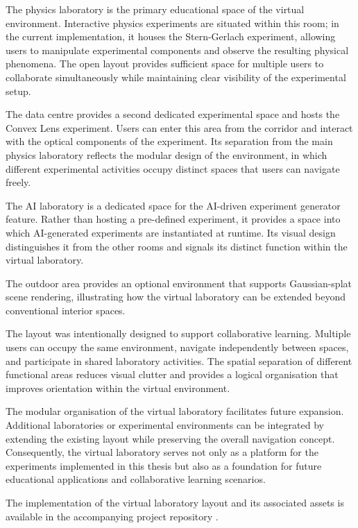 The physics laboratory is the primary educational space of the virtual environment. Interactive physics experiments are situated within this room; in the current implementation, it houses the Stern-Gerlach experiment, allowing users to manipulate experimental components and observe the resulting physical phenomena. The open layout provides sufficient space for multiple users to collaborate simultaneously while maintaining clear visibility of the experimental setup.

The data centre provides a second dedicated experimental space and hosts the Convex Lens experiment. Users can enter this area from the corridor and interact with the optical components of the experiment. Its separation from the main physics laboratory reflects the modular design of the environment, in which different experimental activities occupy distinct spaces that users can navigate freely.

The AI laboratory is a dedicated space for the AI-driven experiment generator feature. Rather than hosting a pre-defined experiment, it provides a space into which AI-generated experiments are instantiated at runtime. Its visual design distinguishes it from the other rooms and signals its distinct function within the virtual laboratory.

The outdoor area provides an optional environment that supports Gaussian-splat scene rendering, illustrating how the virtual laboratory can be extended beyond conventional interior spaces.

The layout was intentionally designed to support collaborative learning. Multiple users can occupy the same environment, navigate independently between spaces, and participate in shared laboratory activities. The spatial separation of different functional areas reduces visual clutter and provides a logical organisation that improves orientation within the virtual environment.

The modular organisation of the virtual laboratory facilitates future expansion. Additional laboratories or experimental environments can be integrated by extending the existing layout while preserving the overall navigation concept. Consequently, the virtual laboratory serves not only as a platform for the experiments implemented in this thesis but also as a foundation for future educational applications and collaborative learning scenarios.

The implementation of the virtual laboratory layout and its associated assets is available in the accompanying project repository \cite{thesisRepo}.


